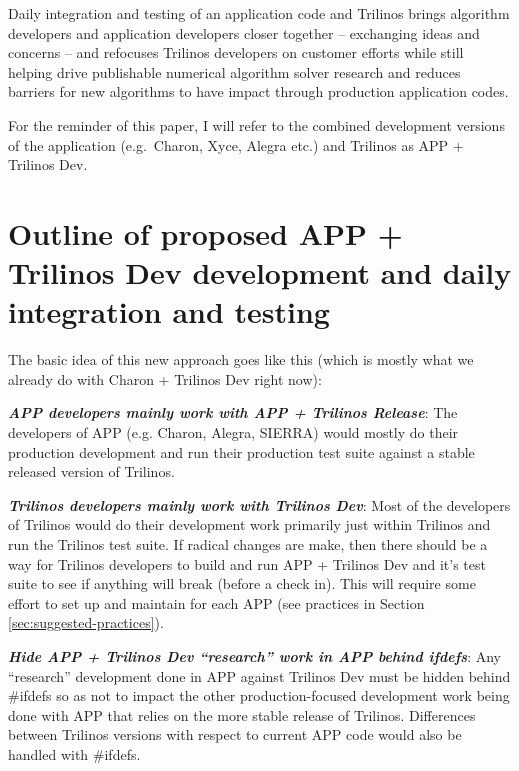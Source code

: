 \documentclass[pdf,ps2pdf,11pt]{SANDreport}
\begin{document}
Daily integration and testing of an application code and Trilinos
brings algorithm developers and application developers closer together --
exchanging ideas and concerns -- and refocuses Trilinos developers on customer 
efforts while still helping drive publishable numerical algorithm solver
research and reduces barriers for new algorithms to have impact through
production application codes.

For the reminder of this paper, I will refer to the combined development
versions of the application (e.g.\ Charon, Xyce, Alegra etc.) and Trilinos as
APP + Trilinos Dev.


%
{}\section{Outline of proposed APP + Trilinos Dev development and daily
integration and testing}
%

The basic idea of this new approach goes like this (which is mostly what we
already do with Charon + Trilinos Dev right now):

{}\textit{\textbf{APP developers mainly work with APP + Trilinos Release}}:
The developers of APP (e.g. Charon, Alegra, SIERRA) would mostly do their
production development and run their production test suite against a stable
released version of Trilinos.

{}\textit{\textbf{Trilinos developers mainly work with Trilinos Dev}}: Most of
the developers of Trilinos would do their development work primarily just within
Trilinos and run the Trilinos test suite.  If radical changes are make, then
there should be a way for Trilinos developers to build and run APP + Trilinos
Dev and it's test suite to see if anything will break (before a check in).
This will require some effort to set up and maintain for each APP (see
practices in Section {}\ref{sec:suggested-practices}).

{}\textit{\textbf{Hide APP + Trilinos Dev ``research'' work in APP behind
ifdefs}}: Any ``research'' development done in APP against Trilinos Dev must
be hidden behind {}\#ifdefs so as not to impact the other production-focused
development work being done with APP that relies on the more stable release of
Trilinos.  Differences between Trilinos versions with respect to current APP
code would also be handled with {}\#ifdefs.
\end{document}
